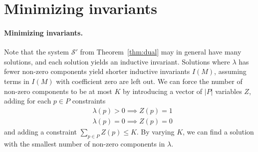 \section{Minimizing invariants}
\label{sec:minimizing_invariants}

\paragraph{Minimizing invariants.} Note that the system $\mathcal{S}'$
from Theorem~\ref{thm:dual} may in general have many
solutions, and each solution yields an inductive invariant. Solutions where
$\lambda$ has fewer non-zero components yield shorter 
inductive invariants $I(M)$, assuming terms in $I(M)$
with coefficient zero are left out. 
We can force the number of
non-zero components to be at most $K$ by introducing a vector of $|P|$
variables $Z$, adding for each $p\in P$ constraints
\begin{align*}
  & \lambda(p)>0\implies Z(p)=1 \\
  & \lambda(p)=0 \implies Z(p)=0
\end{align*}
and adding a constraint $\sum_{p\in P} Z(p) \leq K$. By varying $K$, we
can find a solution with the smallest number of non-zero
components in $\lambda$.




